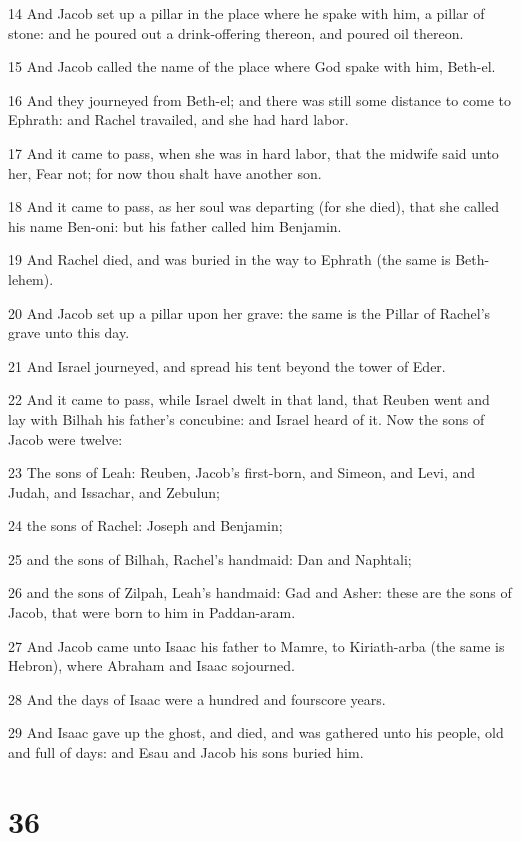 \par 14 And Jacob set up a pillar in the place where he spake with him, a pillar of stone: and he poured out a drink-offering thereon, and poured oil thereon.
\par 15 And Jacob called the name of the place where God spake with him, Beth-el.
\par 16 And they journeyed from Beth-el; and there was still some distance to come to Ephrath: and Rachel travailed, and she had hard labor.
\par 17 And it came to pass, when she was in hard labor, that the midwife said unto her, Fear not; for now thou shalt have another son.
\par 18 And it came to pass, as her soul was departing (for she died), that she called his name Ben-oni: but his father called him Benjamin.
\par 19 And Rachel died, and was buried in the way to Ephrath (the same is Beth-lehem).
\par 20 And Jacob set up a pillar upon her grave: the same is the Pillar of Rachel's grave unto this day.
\par 21 And Israel journeyed, and spread his tent beyond the tower of Eder.
\par 22 And it came to pass, while Israel dwelt in that land, that Reuben went and lay with Bilhah his father's concubine: and Israel heard of it. Now the sons of Jacob were twelve:
\par 23 The sons of Leah: Reuben, Jacob's first-born, and Simeon, and Levi, and Judah, and Issachar, and Zebulun;
\par 24 the sons of Rachel: Joseph and Benjamin;
\par 25 and the sons of Bilhah, Rachel's handmaid: Dan and Naphtali;
\par 26 and the sons of Zilpah, Leah's handmaid: Gad and Asher: these are the sons of Jacob, that were born to him in Paddan-aram.
\par 27 And Jacob came unto Isaac his father to Mamre, to Kiriath-arba (the same is Hebron), where Abraham and Isaac sojourned.
\par 28 And the days of Isaac were a hundred and fourscore years.
\par 29 And Isaac gave up the ghost, and died, and was gathered unto his people, old and full of days: and Esau and Jacob his sons buried him.

\chapter{36}


